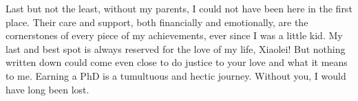 Last but not the least, without my parents, I could not have been here in the first place. Their care and
support, both financially and emotionally, are the cornerstones of every piece of my achievements, ever since I
was a little kid.
My last and best spot is always reserved for the love of my life, Xiaolei!
But nothing written down could come even close to do justice to your love and what it means to me.
Earning a PhD is a tumultuous and hectic journey.
Without you, I would have long been lost.

